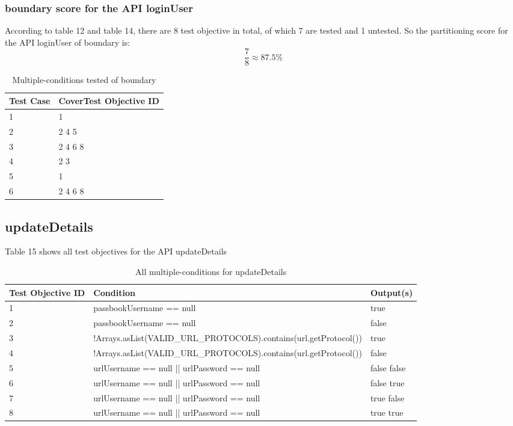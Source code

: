 \documentclass{article}
\begin{document}
\subsubsection{boundary score for the API loginUser}
According to table 12 and table 14, there are 8 test objective in total, of which 7 are tested and 1 untested. So the partitioning score for the API loginUser of boundary is:
$$\frac{7}{8}\approx87.5\%$$
\begin{longtable}{|p{2cm}|p{8cm}|}
\caption{Multiple-conditions tested of boundary}\\
\hline 
Test Case& CoverTest Objective ID\\
\hline  
1&1\\
\hline
2&2 4 5\\
\hline
3&2 4 6 8\\
\hline
4&2 3\\
\hline
5&1\\
\hline
6&2 4 6 8\\
\hline
\end{longtable}

\subsection{updateDetails}
Table 15 shows all test objectives for the API updateDetails
\begin{longtable}{|p{2cm}|p{11cm}|p{2cm}|}
\caption{All multiple-conditions for updateDetails}\\
\hline 
Test Objective ID&Condition&Output(s)\\
\hline  
1&passbookUsername == null&true\\
\hline
2&passbookUsername == null&false\\
\hline
3&!Arrays.asList(VALID\_URL\_PROTOCOLS).contains(url.getProtocol())&true\\
\hline
4&!Arrays.asList(VALID\_URL\_PROTOCOLS).contains(url.getProtocol())&false\\
\hline
5&urlUsername == null || urlPassword == null&false false\\
\hline
6&urlUsername == null || urlPassword == null&false true\\
\hline
7&urlUsername == null || urlPassword == null&true false\\
\hline
8&urlUsername == null || urlPassword == null&true true\\
\hline
\end{longtable}

\end{document}
